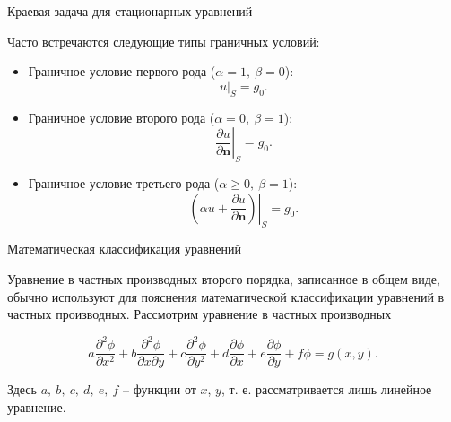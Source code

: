 \documentclass[10pt,xcolor=pst,aspectratio=169]{beamer}
\begin{document}
\begin{frame}{Краевая задача для стационарных уравнений}

    \transdissolve[duration=0.1]
    \justifying
    \large

    Часто встречаются следующие типы граничных условий:

    \begin{itemize}
        \item Граничное условие первого рода ($\alpha = 1, \: \beta = 0$):
            \[
                \left. u \right|_{S} = g_{0}.
            \]

        \item Граничное условие второго рода ($\alpha = 0, \: \beta = 1$):
            \[
                \left. \frac{\partial u}{\partial \mathbf{n}} \right|_{S} = g_{0}.
            \]

        \item Граничное условие третьего рода ($\alpha \geq 0, \: \beta = 1$):
            \[
                \left. \left( \alpha u + \frac{\partial u}{\partial \mathbf{n}} \right) \right|_{S} = g_{0}.
            \]
    \end{itemize}

\end{frame}

\begin{frame}{Математическая классификация уравнений}

    \transdissolve[duration=0.1]
    \justifying
    \large

    Уравнение в частных производных второго порядка, записанное в общем виде, обычно используют для пояснения математической классификации уравнений в частных производных. Рассмотрим уравнение в частных производных

    \[
        a \frac{\partial^{2} \phi}{\partial x^{2}} + b \frac{\partial^{2} \phi}{\partial x \partial y} + c \frac{\partial^{2} \phi}{\partial y^{2}} + d \frac{\partial \phi}{\partial x} + e \frac{\partial \phi}{\partial y} + f \phi = g \left( x, y \right).
    \]

    Здесь $a, \: b, \: c, \: d, \: e, \: f$ -- функции от $x$, $y$, т. е. рассматривается лишь линейное уравнение.

\end{frame}
\end{document}
